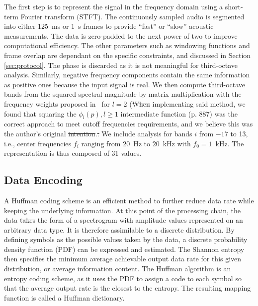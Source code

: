 \documentclass[sensors,article,accept,moreauthors,pdftex,10pt,a4paper]{mdpi}
\providecommand{\DIFaddtex}[1]{{\protect\color{blue}\uwave{#1}}} %
\providecommand{\DIFdeltex}[1]{{\protect\color{red}\sout{#1}}}                      %
\providecommand{\DIFaddbegin}{} %
\providecommand{\DIFaddend}{} %
\providecommand{\DIFdelbegin}{} %
\providecommand{\DIFdelend}{} %
\providecommand{\DIFadd}[1]{\texorpdfstring{\DIFaddtex{#1}}{#1}} %
\providecommand{\DIFdel}[1]{\texorpdfstring{\DIFdeltex{#1}}{}} %
\begin{document}
The first step is to represent the signal in the frequency domain using a short-term Fourier transform (STFT). The continuously sampled audio is segmented into either 125~ms or 1~s frames to provide ``fast'' or ``slow'' acoustic measurements. The data \DIFdelbegin \DIFdel{is }\DIFdelend \DIFaddbegin {\DIFadd{are}} \DIFaddend zero-padded to the next power of two to improve computational efficiency. The other parameters such as windowing functions and frame overlap are dependant on the specific constraints, and discussed in Section \ref{sec:protocol}. The phase is discarded as it is not meaningful for third-octave analysis. Similarly, negative frequency components contain the same information as positive ones because the input signal is real. We then compute third-octave bands from the squared spectral magnitude by matrix multiplication with the frequency weights proposed in~\cite{antoni2010} for $l = 2$ ({\DIFdelbegin \DIFdel{When }\DIFdelend \DIFaddbegin {\DIFadd{when}} \DIFaddend implementing said method, we found that squaring the $\phi_l(p), l \geq 1$ intermediate function (p. 887) was the correct approach to meet cutoff frequencies requirements, and we believe this was the author's original \DIFdelbegin \DIFdel{intention}\DIFdelend \DIFaddbegin {\DIFadd{intention)}\DIFaddend .}\DIFdelbegin \DIFdel{. }\DIFdelend \DIFaddbegin } \DIFaddend We include analysis for bands $i$ from $-17$ to 13, i.e., center frequencies $f_i$ ranging from $20$~Hz to $20$~kHz with $f_0 = 1$~kHz. The representation is thus composed of 31 values.


\subsection{Data Encoding} \label{sec:dataenc}

A Huffman coding scheme \cite{huffman1952} is an efficient method to further reduce data rate while keeping the underlying information. At this point of the processing chain, the data \DIFdelbegin \DIFdel{takes }\DIFdelend \DIFaddbegin {\DIFadd{take}} \DIFaddend the form of a spectrogram with amplitude values represented on an arbitrary data type. It is therefore assimilable to a discrete distribution. By defining symbols as the possible values taken by the data, a discrete probability density function (PDF) can be expressed and estimated. The Shannon entropy then specifies the minimum average achievable output data rate for this given distribution, or average information content. The Huffman algorithm is an entropy coding scheme, as it uses the PDF to assign a code to each symbol so that the average output rate is the closest to the entropy. The resulting mapping function is called a Huffman dictionary.
\end{document}
